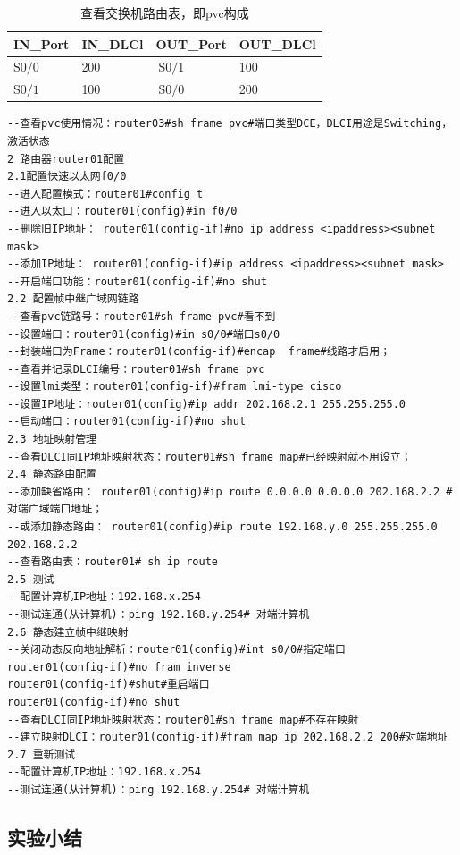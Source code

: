 \documentclass[lang=cn,11pt,a4paper,cite=authoryear]{elegantpaper}
\begin{document}
\begin{table}[htbp]

\centering
\begin{tabular}{|l|l|l|l|}
	\hline IN\_Port & IN\_DLCl & OUT\_Port & OUT\_DLCl \\
	\hline $\mathrm{S} 0 / 0$ & 200 & $\mathrm{~S} 0 / 1$ & 100 \\
	\hline $\mathrm{S} 0 / 1$ & 100 & $\mathrm{~S} 0 / 0$ & 200 \\
	\hline
\end{tabular}
\caption{查看交换机路由表，即pvc构成}
\end{table}
\begin{lstlisting}
--查看pvc使用情况：router03#sh frame pvc#端口类型DCE，DLCI用途是Switching，激活状态
2 路由器router01配置
2.1配置快速以太网f0/0
--进入配置模式：router01#config t
--进入以太口：router01(config)#in f0/0
--删除旧IP地址： router01(config-if)#no ip address <ipaddress><subnet mask>
--添加IP地址： router01(config-if)#ip address <ipaddress><subnet mask>
--开启端口功能：router01(config-if)#no shut
2.2 配置帧中继广域网链路
--查看pvc链路号：router01#sh frame pvc#看不到
--设置端口：router01(config)#in s0/0#端口s0/0
--封装端口为Frame：router01(config-if)#encap  frame#线路才启用； 
--查看并记录DLCI编号：router01#sh frame pvc
--设置lmi类型：router01(config-if)#fram lmi-type cisco 
--设置IP地址：router01(config)#ip addr 202.168.2.1 255.255.255.0 
--启动端口：router01(config-if)#no shut
2.3 地址映射管理
--查看DLCI同IP地址映射状态：router01#sh frame map#已经映射就不用设立；
2.4 静态路由配置
--添加缺省路由： router01(config)#ip route 0.0.0.0 0.0.0.0 202.168.2.2 # 对端广域端口地址；
--或添加静态路由： router01(config)#ip route 192.168.y.0 255.255.255.0 202.168.2.2 
--查看路由表：router01# sh ip route
2.5 测试
--配置计算机IP地址：192.168.x.254
--测试连通(从计算机)：ping 192.168.y.254# 对端计算机
2.6 静态建立帧中继映射
--关闭动态反向地址解析：router01(config)#int s0/0#指定端口
router01(config-if)#no fram inverse
router01(config-if)#shut#重启端口
router01(config-if)#no shut
--查看DLCI同IP地址映射状态：router01#sh frame map#不存在映射
--建立映射DLCI：router01(config-if)#fram map ip 202.168.2.2 200#对端地址 
2.7 重新测试
--配置计算机IP地址：192.168.x.254
--测试连通(从计算机)：ping 192.168.y.254# 对端计算机

\end{lstlisting}

\subsection{实验小结}
\end{document}

